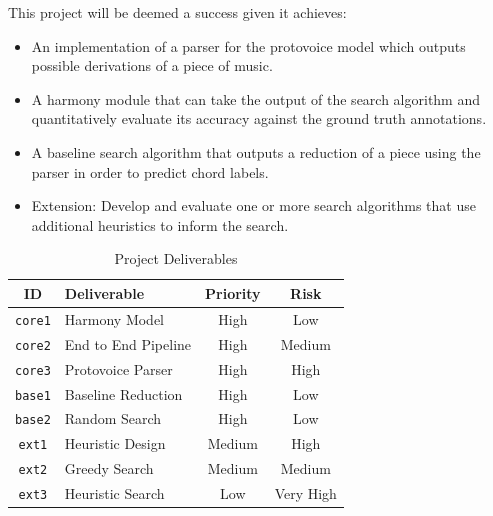 \documentclass[12pt,a4paper,twoside,openright]{report}
\theoremstyle{definition}
\begin{document}
This project will be deemed a success given it achieves:
\begin{itemize}
  \item An implementation of a parser for the protovoice model which outputs possible derivations of a piece of music. 
  \item A harmony module that can take the output of the search algorithm and quantitatively evaluate its accuracy against the ground truth annotations.
  \item A baseline search algorithm that outputs a reduction of a piece using the parser in order to predict chord labels.
  \item Extension: Develop and evaluate one or more search algorithms that use additional heuristics to inform the search.
\end{itemize} 

\begin{table}[h]
  \caption{Project Deliverables}
  \vspace{\baselineskip}
  \label{tab:deliverables}
  \centering
  \begin{tabularx}{0.9\textwidth}{cXcc}
    {\large \textbf{ID}} & \large \textbf{Deliverable} & \large \textbf{Priority} & \large \textbf{Risk} \\
    \toprule
    \texttt{core1} & Harmony Model & High & Low \\
    \texttt{core2} & End to End Pipeline  & High & Medium \\
    \texttt{core3} & Protovoice Parser & High & High \\
    \texttt{base1} & Baseline Reduction & High & Low \\
    \texttt{base2} & Random Search & High & Low \\
    \texttt{ext1} & Heuristic Design & Medium & High \\
    \texttt{ext2} & Greedy Search & Medium & Medium \\
    \texttt{ext3} & Heuristic Search & Low & Very High \\
  \end{tabularx}
\end{table}
\end{document}

